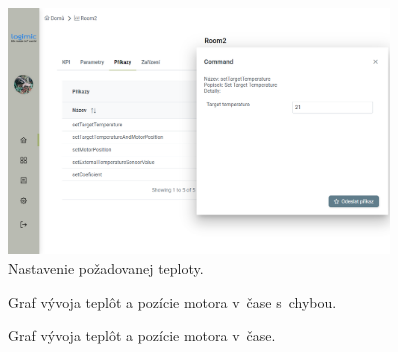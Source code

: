 \begin{figure}[H]
    \centering
    \includegraphics[width=0.9\textwidth]{obrazky-figures/setTarget.png}
    \caption{Nastavenie požadovanej teploty.}
    \label{fig:test_setTarget}
\end{figure}



\begin{figure}[H]
    \centering
    
    \caption{Graf vývoja teplôt a pozície motora v~čase s~chybou.}
    \label{fig:statisticGraph}
\end{figure}

\begin{figure}[H]
    \centering
    
    \caption{Graf vývoja teplôt a pozície motora v~čase.}
    \label{fig:statisticGraph01}
\end{figure}